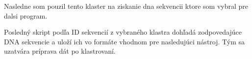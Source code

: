 Nasledne som pouzil tento klaster na ziskanie dna sekvencii ktore som vybral pre dalsi program.

Posledný skript podľa ID sekvencií z vybraného klastra dohľadá zodpovedajúce DNA sekvencie a uloží ich vo formáte vhodnom pre nasledujúci nástroj. Tým sa uzatvára príprava dát po klastrovaní.
